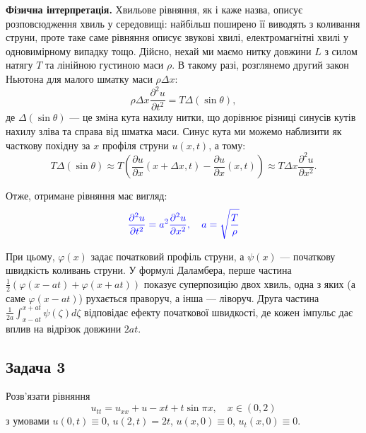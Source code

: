 \documentclass{exam_template}
\begin{document}
\textbf{Фізична інтерпретація.} Хвильове рівняння, як і каже назва, описує
розповсюдження хвиль у середовищі: найбільш поширено її виводять з коливання
струни, проте таке саме рівняння описує звукові хвилі, електромагнітні хвилі у
одновимірному випадку тощо. Дійсно, нехай ми маємо нитку довжини $L$ з 
силом натягу $T$ та лінійною густиною маси $\rho$. В такому разі, розглянемо 
другий закон Ньютона для малого шматку маси $\rho \Delta x$:
\begin{equation*}
    \rho \Delta x \frac{\partial^2 u}{\partial t^2} = T \Delta(\sin \theta),
\end{equation*}
де $\Delta(\sin \theta)$ --- це зміна кута нахилу нитки, що дорівнює
різниці синусів кутів нахилу зліва та справа від шматка маси. Синус 
кута ми можемо наблизити як часткову похідну за $x$ профіля струни $u(x,t)$, 
а тому:
\begin{equation*}
    T \Delta(\sin \theta) \approx T\left(\frac{\partial u}{\partial x}(x+\Delta x,t) - \frac{\partial u}{\partial x}(x,t)\right) \approx T\Delta x \frac{\partial^2 u}{\partial x^2}.
\end{equation*}

Отже, отримане рівняння має вигляд:
\begin{equation*}
    \textcolor{blue}{\frac{\partial^2 u}{\partial t^2} = a^2 \frac{\partial^2 u}{\partial x^2}, \quad a = \sqrt{\frac{T}{\rho}}}
\end{equation*}

При цьому, $\varphi(x)$ задає початковий профіль струни, а $\psi(x)$ ---
початкову швидкість коливань струни. У формулі Даламбера, перше частина
$\frac{1}{2}(\varphi(x-at) + \varphi(x+at))$ показує суперпозицію двох хвиль,
одна з яких (а саме $\varphi(x-at)$) рухається праворуч, а інша ---  ліворуч.
Друга частина $\frac{1}{2a}\int_{x-at}^{x+at} \psi(\zeta)d\zeta$ відповідає
ефекту початкової швидкості, де кожен імпульс дає вплив на відрізок довжини
$2at$.


\newpage

\subsection{Задача 3}

\begin{problem}
    Розв'язати рівняння
    \begin{equation*}
        u_{tt} = u_{xx} + u - xt + t \sin \pi x, \quad x \in (0,2)
    \end{equation*}
    з умовами $u(0,t)\equiv 0$, $u(2,t)=2t$, $u(x,0)\equiv 0$,
    $u_t(x,0)\equiv 0$.
\end{problem}
\end{document}
